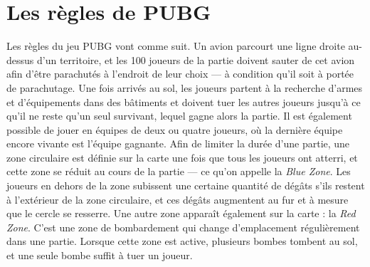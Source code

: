 \section{Les règles de PUBG}
Les r\`egles du jeu PUBG vont comme suit.
Un avion parcourt une ligne droite au-dessus d'un territoire, et les 100 joueurs de la partie doivent sauter de cet avion afin d'être parachutés à l'endroit de leur choix --- à condition qu'il soit à portée de parachutage. Une fois arrivés au sol, les joueurs partent à la recherche d'armes et d'équipements dans des bâtiments et doivent tuer les autres joueurs jusqu'à ce qu'il ne reste qu'un seul survivant, lequel gagne alors la partie. Il est également possible de jouer en \'equipes de deux ou quatre joueurs, o\`u la dernière équipe encore vivante est l'\'equipe gagnante. Afin de limiter la durée d'une partie, une zone circulaire est définie sur la carte une fois que tous les joueurs ont atterri, et cette zone se réduit au cours de la partie --- ce qu'on appelle la \emph{Blue Zone}. Les joueurs en dehors de la zone subissent une certaine quantité de dégâts s'ils restent \`a l'ext\'erieur de la zone circulaire, et ces dégâts augmentent au fur et à mesure que le cercle se resserre. Une autre zone apparaît également sur la carte : la \emph{Red Zone}. C'est une zone de bombardement qui change d'emplacement régulièrement dans une partie. Lorsque cette zone est active, plusieurs bombes tombent au sol, et une seule bombe suffit à tuer un joueur.
%




